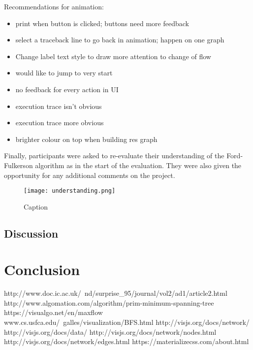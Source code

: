 \documentclass{l4proj}
\begin{document}
Recommendations for animation:
\begin{itemize}[noitemsep]
    \item print when button is clicked; buttons need more feedback
    \item select a traceback line to go back in animation; happen on one graph
    \item Change label text style to draw more attention to change of flow
    \item would like to jump to very start
    \item no feedback for every action in UI
    \item execution trace isn't obvious
    \item execution trace more obvious
    \item brighter colour on top when building res graph
\end{itemize}

\newpage
Finally, participants were asked to re-evaluate their understanding of the Ford-Fulkerson algorithm as in the start of the evaluation. They were also given the opportunity for any additional comments on the project.

\begin{figure}[h]
    \centering
    \texttt{[image: understanding.png]}
    \caption{Caption}
    \label{fig:my_label}
\end{figure}
\section{Discussion}


\chapter{Conclusion}
\begin{comment}
Summarise the whole project for a lazy reader who didn't read the rest.
Summarise briefly and fairly. Indicate what future work could be done, but remember: you won't get credit for things you haven't done.
\end{comment}

\begin{thebibliography}{}
http://www.doc.ic.ac.uk/~nd/surprise\_95/journal/vol2/ad1/article2.html
http://www.algomation.com/algorithm/prim-minimum-spanning-tree
https://visualgo.net/en/maxflow
www.cs.usfca.edu/~galles/visualization/BFS.html
http://visjs.org/docs/network/
http://visjs.org/docs/data/
http://visjs.org/docs/network/nodes.html
http://visjs.org/docs/network/edges.html
https://materializecss.com/about.html

\end{thebibliography}
\end{document}

